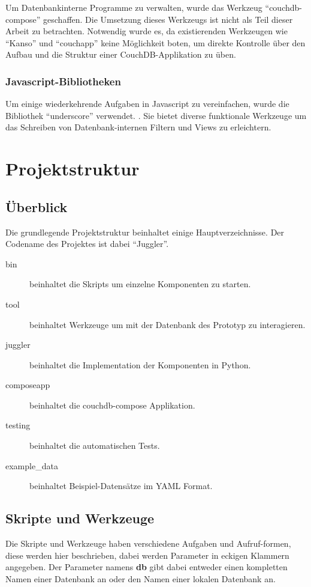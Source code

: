 Um Datenbankinterne Programme zu verwalten,
wurde das Werkzeug ``couchdb-compose'' \cite{couchdb:compose} geschaffen.
Die Umsetzung dieses Werkzeugs ist nicht als Teil dieser Arbeit zu betrachten.
Notwendig wurde es, da existierenden Werkzeugen wie ``Kanso'' und ``couchapp''
keine Möglichkeit boten, um direkte Kontrolle über den Aufbau und die Struktur 
einer CouchDB-Applikation zu üben.

\subsubsection{Javascript-Bibliotheken}

Um einige wiederkehrende Aufgaben in Javascript zu vereinfachen,
wurde die Bibliothek ``underscore'' verwendet. \cite{javascript:underscore}.
Sie bietet diverse funktionale Werkzeuge um das Schreiben
von Datenbank-internen Filtern und Views zu erleichtern.


\section{Projektstruktur}
\subsection{Überblick}

Die grundlegende Projektstruktur beinhaltet einige Hauptverzeichnisse.
Der Codename des Projektes ist dabei ``Juggler''.


\begin{description}
    \item[bin] beinhaltet die Skripts um einzelne Komponenten zu starten.
    \item[tool] beinhaltet Werkzeuge um mit der Datenbank des Prototyp zu interagieren.
    \item[juggler] beinhaltet die Implementation der Komponenten in Python.
    \item[composeapp] beinhaltet die couchdb-compose Applikation.
    \item[testing] beinhaltet die automatischen Tests.
    \item[example\_data] beinhaltet Beispiel-Datensätze im \ac{YAML} Format.
\end{description}

\subsection{Skripte und Werkzeuge}
Die Skripte und Werkzeuge haben verschiedene Aufgaben und Aufruf-formen,
diese werden hier beschrieben, dabei werden Parameter in eckigen Klammern angegeben.
Der Parameter namens \textbf{db} gibt dabei entweder einen kompletten Namen einer  Datenbank an oder den Namen einer lokalen Datenbank an.

